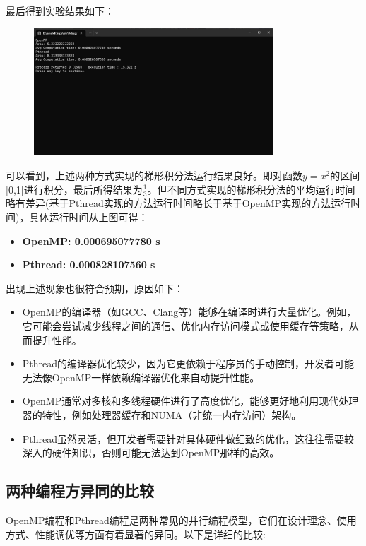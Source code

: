\documentclass{nku}
\begin{document}
最后得到实验结果如下：
\begin{figure}[H]
\centering
\includegraphics[width=0.8\textwidth]{fig/fig1.jpg}
\end{figure}

可以看到，上述两种方式实现的梯形积分法运行结果良好。即对函数$y=x^2$的区间[0,1]进行积分，最后所得结果为$\frac{1}{3}$。但不同方式实现的梯形积分法的平均运行时间略有差异(基于Pthread实现的方法运行时间略长于基于OpenMP实现的方法运行时间)，具体运行时间从上图可得：
\begin{itemize}
    \item \textbf{OpenMP: 0.000695077780 s}
    \item \textbf{Pthread: 0.000828107560 s}
\end{itemize}

出现上述现象也很符合预期，原因如下：
\begin{itemize}
    \item OpenMP的编译器（如GCC、Clang等）能够在编译时进行大量优化。例如，它可能会尝试减少线程之间的通信、优化内存访问模式或使用缓存等策略，从而提升性能。
    \item Pthread的编译器优化较少，因为它更依赖于程序员的手动控制，开发者可能无法像OpenMP一样依赖编译器优化来自动提升性能。
    \item OpenMP通常对多核和多线程硬件进行了高度优化，能够更好地利用现代处理器的特性，例如处理器缓存和NUMA（非统一内存访问）架构。
    \item Pthread虽然灵活，但开发者需要针对具体硬件做细致的优化，这往往需要较深入的硬件知识，否则可能无法达到OpenMP那样的高效。
\end{itemize}

\subsection{两种编程方异同的比较}
OpenMP编程和Pthread编程是两种常见的并行编程模型，它们在设计理念、使用方式、性能调优等方面有着显著的异同。以下是详细的比较:
\end{document}
